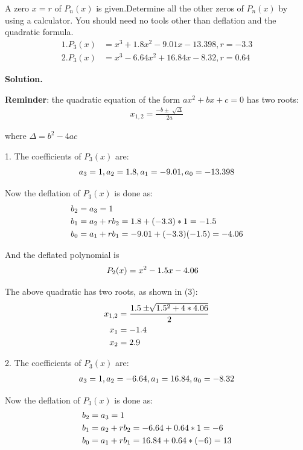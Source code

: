 \begin{exercise}{3} %
A zero $x = r$ of $P_n(x)$ is given.Determine all the other zeros of $P_n(x)$ by
using a calculator. You should need no tools other than deflation and the quadratic
formula.
\begin{align}
1. P_3(x) &= x^3+1.8x^2-9.01x-13.398, r =-3.3\\
2. P_3(x) &= x^3-6.64x^2+16.84x-8.32, r = 0.64
\end{align}

\textbf{Solution.} 

\textbf{Reminder}: the quadratic equation of the form $ax^2 + bx +c = 0$ has two roots:
\begin{align}
x_{1,2} = \frac{-b \pm \sqrt[]{\Delta}}{2a}
\end{align}

where $\Delta = b^2 - 4ac$ 

1. The coefficients of $P_3(x)$ are:
\begin{align}
a_3 = 1, a_2 = 1.8, a_1 = -9.01, a_0 = -13.398 \notag 
\end{align}

Now the deflation of $P_3(x)$ is done as: 
\begin{align}
b_2 &= a_3 = 1 \notag \\ 
b_1 &= a_2 + rb_2 = 1.8 + (-3.3)*1 = -1.5 \notag \\
b_0 &= a_1 + rb_1 = -9.01 + (-3.3)(-1.5) = -4.06 \notag 
\end{align}

And the deflated polynomial is
\begin{align}
P_2(x) &= x^2 - 1.5x - 4.06 \notag 
\end{align}


The above quadratic has two roots, as shown in (3): 
\begin{align}
x_{1,2} &= \frac{1.5 \pm \sqrt[]{1.5^2+4*4.06}}{2} \notag \\
x_1 &= -1.4 \notag \\
x_2 &= 2.9 \notag
\end{align}

2. The coefficients of $P_3(x)$ are:
\begin{align}
a_3 = 1, a_2 = -6.64, a_1 = 16.84, a_0 = -8.32 \notag 
\end{align}


Now the deflation of $P_3(x)$ is done as: 
\begin{align}
b_2 &= a_3 = 1 \notag \\ 
b_1 &= a_2 + rb_2 = -6.64 + 0.64*1 = -6 \notag \\
b_0 &= a_1 + rb_1 = 16.84 + 0.64*(-6) = 13 \notag 
\end{align}



\end{exercise}
